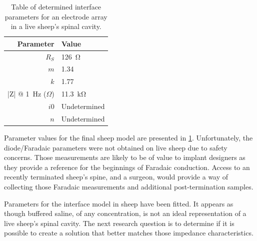     \begin{table}
      \caption{Table of determined interface parameters for an electrode array in a live sheep's spinal cavity.}
      \label{tab:ModelParameters_sheep}
      \begin{center}
        \begin{tabular}{r | l}
            Parameter & Value \\
            \hline
    
            $R_{S}$ & \SI{126}{\ohm} \\
            
            $m$& 1.34\\
            $k$ & 1.77\\
            |Z| @ \SI{1}{\hertz} ($\Omega$)& \SI{11.3}{\kilo\ohm} \\
    
            $i0$ & Undetermined\\
            $n$ & Undetermined\\
        \end{tabular}
      \end{center}
    \end{table}
    Parameter values for the final sheep model are presented in \cref{tab:ModelParameters_sheep}.
    Unfortunately, the diode/Faradaic parameters were not obtained on live sheep due to safety concerns.
    Those measurements are likely to be of value to implant designers as they provide a reference for the beginnings of Faradaic conduction.
    Access to an recently terminated sheep's spine, and a surgeon, would provide a way of collecting those Faradaic measurements and additional post-termination samples.
    
    Parameters for the interface model in sheep have been fitted.
    It appears as though buffered saline, of any concentration, is not an ideal representation of a live sheep's spinal cavity.
    The next research question is to determine if it is possible to create a solution that better matches those impedance characteristics.



    
